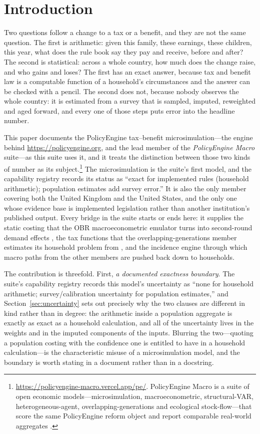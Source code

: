 \section{Introduction}
\label{sec:intro}

Two questions follow a change to a tax or a benefit, and they are not the same question. The first is arithmetic: given this family, these earnings, these children, this year, what does the rule book say they pay and receive, before and after? The second is statistical: across a whole country, how much does the change raise, and who gains and loses? The first has an exact answer, because tax and benefit law is a computable function of a household's circumstances and the answer can be checked with a pencil. The second does not, because nobody observes the whole country: it is estimated from a survey that is sampled, imputed, reweighted and aged forward, and every one of those steps puts error into the headline number.

This paper documents the PolicyEngine tax--benefit microsimulation---the engine behind \url{https://policyengine.org}, and the lead member of the \emph{PolicyEngine Macro} suite---as this suite uses it, and it treats the distinction between those two kinds of number as its subject.\footnote{\url{https://policyengine-macro.vercel.app/pe/}. PolicyEngine Macro is a suite of open economic models---microsimulation, macroeconometric, structural-VAR, heterogeneous-agent, overlapping-generations and ecological stock-flow---that score the same PolicyEngine reform object and report comparable real-world aggregates \citep{policyengine}.} The microsimulation is the suite's first model, and the capability registry records its status as ``exact for implemented rules (household arithmetic); population estimates add survey error.'' It is also the only member covering both the United Kingdom and the United States, and the only one whose evidence base is implemented legislation rather than another institution's published output. Every bridge in the suite starts or ends here: it supplies the static costing that the OBR macroeconometric emulator turns into second-round demand effects \citep{ahmadi2026obr}, the tax functions that the overlapping-generations member estimates its household problem from \citep{ahmadi2026og}, and the incidence engine through which macro paths from the other members are pushed back down to households.

The contribution is threefold. First, \emph{a documented exactness boundary}. The suite's capability registry records this model's uncertainty as ``none for household arithmetic; survey/calibration uncertainty for population estimates,'' and Section~\ref{sec:uncertainty} sets out precisely why the two clauses are different in kind rather than in degree: the arithmetic inside a population aggregate is exactly as exact as a household calculation, and all of the uncertainty lives in the weights and in the imputed components of the inputs. Blurring the two---quoting a population costing with the confidence one is entitled to have in a household calculation---is the characteristic misuse of a microsimulation model, and the boundary is worth stating in a document rather than in a docstring.


